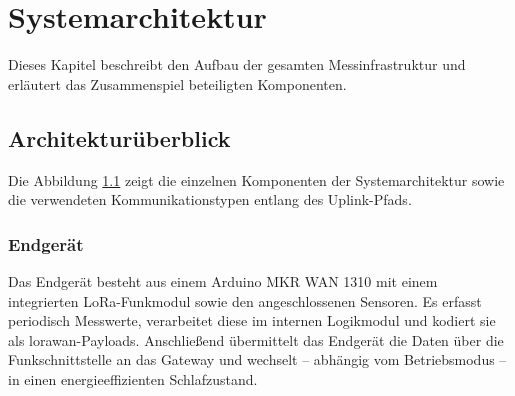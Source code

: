 %
%

\chapter{Systemarchitektur}
	Dieses Kapitel beschreibt den Aufbau der gesamten Messinfrastruktur und erläutert das Zusammenspiel beteiligten Komponenten.
	
\section{Architekturüberblick}
	Die Abbildung \ref{fig:sysArch} zeigt die einzelnen Komponenten der Systemarchitektur sowie die verwendeten Kommunikationstypen entlang des Uplink-Pfads.

	
	\begin{figure}[H]
		\centering
		\label{fig:sysArch}
	\end{figure}

\subsection{Endgerät}
	Das Endgerät besteht aus einem Arduino MKR WAN 1310 mit einem integrierten LoRa-Funkmodul sowie den angeschlossenen Sensoren. Es erfasst periodisch Messwerte, verarbeitet diese im internen Logikmodul und kodiert sie als \acs{lorawan}-Payloads. Anschlie{\ss}end übermittelt das Endgerät die Daten über die Funkschnittstelle an das Gateway und wechselt – abhängig vom Betriebsmodus – in einen energieeffizienten Schlafzustand. 
	

